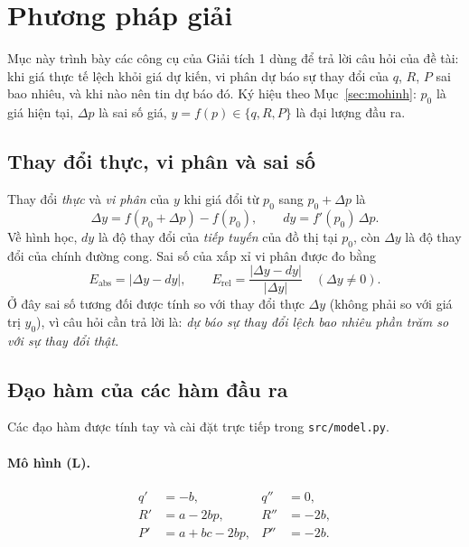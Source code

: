 \section{Phương pháp giải}\label{sec:phuongphap}

Mục này trình bày các công cụ của Giải tích 1 dùng để trả lời câu hỏi của đề tài: khi
giá thực tế lệch khỏi giá dự kiến, vi phân dự báo sự thay đổi của $q$, $R$, $P$ sai
bao nhiêu, và khi nào nên tin dự báo đó. Ký hiệu theo Mục~\ref{sec:mohinh}: $p_0$ là
giá hiện tại, $\Delta p$ là sai số giá, $y=f(p)\in\{q,R,P\}$ là đại lượng đầu ra.

\subsection{Thay đổi thực, vi phân và sai số}
Thay đổi \emph{thực} và \emph{vi phân} của $y$ khi giá đổi từ $p_0$ sang $p_0+\Delta p$ là
\begin{equation}\label{eq:dy}
\Delta y = f(p_0+\Delta p)-f(p_0), \qquad dy = f'(p_0)\,\Delta p .
\end{equation}
Về hình học, $dy$ là độ thay đổi của \emph{tiếp tuyến} của đồ thị tại $p_0$, còn
$\Delta y$ là độ thay đổi của chính đường cong. Sai số của xấp xỉ vi phân được đo bằng
\begin{equation}
E_{\mathrm{abs}} = |\Delta y - dy|, \qquad
E_{\mathrm{rel}} = \frac{|\Delta y - dy|}{|\Delta y|}\quad(\Delta y\neq 0).
\end{equation}
Ở đây sai số tương đối được tính so với thay đổi thực $\Delta y$ (không phải so với giá
trị $y_0$), vì câu hỏi cần trả lời là: \emph{dự báo sự thay đổi lệch bao nhiêu phần
trăm so với sự thay đổi thật}.

\subsection{Đạo hàm của các hàm đầu ra}
Các đạo hàm được tính tay và cài đặt trực tiếp trong \texttt{src/model.py}.

\paragraph{Mô hình (L).}
\begin{align*}
q' &= -b, & q'' &= 0, \\
R' &= a-2bp, & R'' &= -2b, \\
P' &= a+bc-2bp, & P'' &= -2b.
\end{align*}

